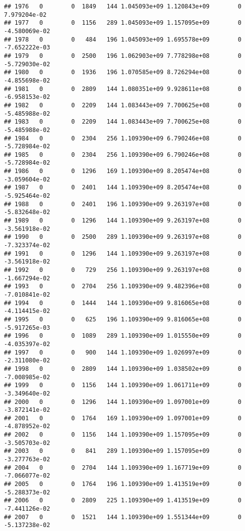 \documentclass[
]{article}
\begin{document}
\begin{enumerate}
\begin{verbatim}
## 1976   0        0  1849   144 1.045093e+09 1.120843e+09        0  7.979204e-02
## 1977   0        0  1156   289 1.045093e+09 1.157095e+09        0 -4.580069e-02
## 1978   0        0   484   196 1.045093e+09 1.695578e+09        0 -7.652222e-03
## 1979   0        0  2500   196 1.062903e+09 7.778298e+08        0 -5.729030e-02
## 1980   0        0  1936   196 1.070585e+09 8.726294e+08        0 -4.855698e-02
## 1981   0        0  2809   144 1.080351e+09 9.928611e+08        0 -6.958153e-02
## 1982   0        0  2209   144 1.083443e+09 7.700625e+08        0 -5.485988e-02
## 1983   0        0  2209   144 1.083443e+09 7.700625e+08        0 -5.485988e-02
## 1984   0        0  2304   256 1.109390e+09 6.790246e+08        0 -5.728984e-02
## 1985   0        0  2304   256 1.109390e+09 6.790246e+08        0 -5.728984e-02
## 1986   0        0  1296   169 1.109390e+09 8.205474e+08        0 -3.059604e-02
## 1987   0        0  2401   144 1.109390e+09 8.205474e+08        0 -5.925464e-02
## 1988   0        0  2401   196 1.109390e+09 9.263197e+08        0 -5.832648e-02
## 1989   0        0  1296   144 1.109390e+09 9.263197e+08        0 -3.561918e-02
## 1990   0        0  2500   289 1.109390e+09 9.263197e+08        0 -7.323374e-02
## 1991   0        0  1296   144 1.109390e+09 9.263197e+08        0 -3.561918e-02
## 1992   0        0   729   256 1.109390e+09 9.263197e+08        0 -1.667294e-02
## 1993   0        0  2704   256 1.109390e+09 9.482396e+08        0 -7.010841e-02
## 1994   0        0  1444   144 1.109390e+09 9.816065e+08        0 -4.114415e-02
## 1995   0        0   625   196 1.109390e+09 9.816065e+08        0 -5.917265e-03
## 1996   0        0  1089   289 1.109390e+09 1.015550e+09        0 -4.035397e-02
## 1997   0        0   900   144 1.109390e+09 1.026997e+09        0 -2.311080e-02
## 1998   0        0  2809   144 1.109390e+09 1.038502e+09        0 -7.008985e-02
## 1999   0        0  1156   144 1.109390e+09 1.061711e+09        0 -3.349640e-02
## 2000   0        0  1296   144 1.109390e+09 1.097001e+09        0 -3.872141e-02
## 2001   0        0  1764   169 1.109390e+09 1.097001e+09        0 -4.878952e-02
## 2002   0        0  1156   144 1.109390e+09 1.157095e+09        0 -3.505703e-02
## 2003   0        0   841   289 1.109390e+09 1.157095e+09        0 -3.277763e-02
## 2004   0        0  2704   144 1.109390e+09 1.167719e+09        0 -7.066077e-02
## 2005   0        0  1764   196 1.109390e+09 1.413519e+09        0 -5.288373e-02
## 2006   0        0  2809   225 1.109390e+09 1.413519e+09        0 -7.441126e-02
## 2007   0        0  1521   144 1.109390e+09 1.551344e+09        0 -5.137238e-02

\end{verbatim}
\end{enumerate}
\end{document}
